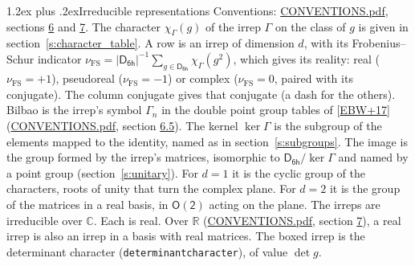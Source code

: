 \documentclass[10pt,a4paper]{article}
\makeatletter
\renewcommand\section{\@startsection{section}{1}{\z@}{-3ex plus -1ex minus -.2ex}%
  {1.2ex plus .2ex}{\normalfont\large\sffamily\bfseries\color{parttitle}}}
\numberwithin{equation}{section}
\newcommand{\grp}[1]{\mathsf{#1}}
\newcommand{\irchar}[1]{\chi_{#1}}
\newcommand{\fsind}{\nu_{\mathrm{FS}}}
\makeatother
\begin{document}
\section{Irreducible representations}\label{s:irreps}
Conventions: \href{../../CONVENTIONS.pdf}{CONVENTIONS.pdf}, sections \href{../../CONVENTIONS.pdf\#conv.6}{6} and \href{../../CONVENTIONS.pdf\#conv.7}{7}.
\leavevmode\label{n:function.character}\label{n:irrep.Gamma}The character $\irchar{\Gamma}(g)$ of the irrep $\Gamma$ on the class of $g$ is given in section~\ref{s:character_table}.
\leavevmode\label{n:index.dimension}\label{n:index.frobenius}\label{n:head.irrep}\label{n:head.reality}A row is an irrep of dimension $d$, with its Frobenius--Schur indicator $\fsind = |\grp{D_{6h}}|^{-1}\allowbreak\sum_{g\in\grp{D_{6h}}}\irchar{\Gamma}(g^2)$, which gives its reality: real ($\fsind = +1$), pseudoreal ($\fsind = -1$) or complex ($\fsind = 0$, paired with its conjugate). \label{n:head.conjugate}The column conjugate gives that conjugate (a dash for the others). \label{n:head.bilbao}\label{n:irrep.alias.gamma}Bilbao is the irrep's symbol $\Gamma_n$ in the double point group tables of [\href{../../../REFERENCES.pdf\#ref.EBW+17}{EBW+17}] (\href{../../CONVENTIONS.pdf}{CONVENTIONS.pdf}, section \href{../../CONVENTIONS.pdf\#conv.6.5}{6.5}). \label{n:head.kernel}The kernel $\ker\Gamma$ is the subgroup of the elements mapped to the identity, named as in section~\ref{s:subgroups}. \label{n:head.image}The image is the group formed by the irrep's matrices, isomorphic to $\grp{D_{6h}}/\ker\Gamma$ and named by a point group (section~\ref{s:unitary}). For $d = 1$ it is the cyclic group of the characters, roots of unity that turn the complex plane. For $d = 2$ it is the group of the matrices in a real basis, in $\grp{O(2)}$ acting on the plane. The irreps are irreducible over $\mathbb{C}$. Each is real. Over $\mathbb{R}$ (\href{../../CONVENTIONS.pdf}{CONVENTIONS.pdf}, section \href{../../CONVENTIONS.pdf\#conv.7}{7}), a real irrep is also an irrep in a basis with real matrices. \label{n:mark.determinant}The boxed irrep is the determinant character (\texttt{determinantcharacter}), of value $\det g$.
\setlength{\emergencystretch}{2em}\par\setlength{\emergencystretch}{0pt}
\end{document}
